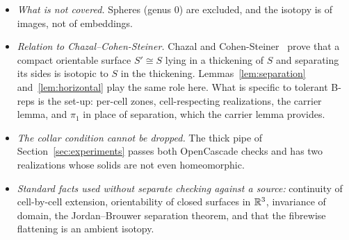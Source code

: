 \begin{remark}
\begin{itemize}
\item \emph{What is not covered.} Spheres (genus 0) are excluded, and the isotopy is of images, not of
embeddings.
\item \emph{Relation to Chazal--Cohen-Steiner.} Chazal and Cohen-Steiner~\cite[Thm.~2.1]{CCS05} prove that a compact
orientable surface $S'\cong S$ lying in a thickening of $S$ and separating its sides is isotopic to $S$ in the
thickening. Lemmas~\ref{lem:separation} and~\ref{lem:horizontal} play the same role here. What is specific to
tolerant B-reps is the set-up: per-cell zones, cell-respecting realizations, the carrier lemma, and $\pi_1$ in place
of separation, which the carrier lemma provides.
\item \emph{The collar condition cannot be dropped.} The thick pipe of Section~\ref{sec:experiments} passes both
OpenCascade checks and has two realizations whose solids are not even homeomorphic.
\item \emph{Standard facts used without separate checking against a source:} continuity of cell-by-cell extension,
orientability of closed surfaces in $\mathbb{R}^3$, invariance of domain, the Jordan--Brouwer separation theorem, and that
the fibrewise flattening is an ambient isotopy.
\end{itemize}
\end{remark}
